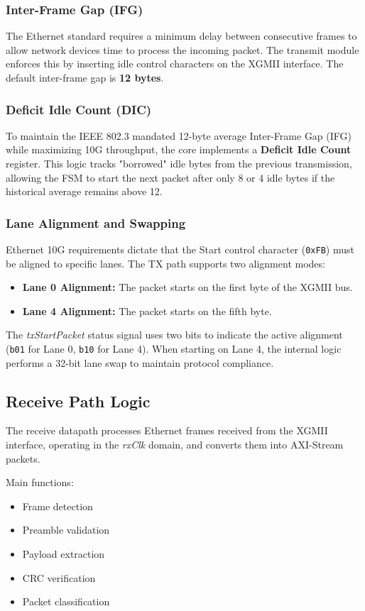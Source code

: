 \subsubsection{Inter-Frame Gap (IFG)}
The Ethernet standard requires a minimum delay between consecutive frames to allow network devices time to process the incoming packet. The transmit module enforces this by inserting idle control characters on the XGMII interface. The default inter-frame gap is \textbf{12 bytes}.

\subsubsection{Deficit Idle Count (DIC)}
To maintain the IEEE 802.3 mandated 12-byte average Inter-Frame Gap (IFG) while maximizing 10G throughput, the core implements a \textbf{Deficit Idle Count} register. This logic tracks "borrowed" idle bytes from the previous transmission, allowing the FSM to start the next packet after only 8 or 4 idle bytes if the historical average remains above 12.

\subsubsection{Lane Alignment and Swapping}
Ethernet 10G requirements dictate that the Start control character (\texttt{0xFB}) must be aligned to specific lanes. The TX path supports two alignment modes:
\begin{itemize}
    \item \textbf{Lane 0 Alignment:} The packet starts on the first byte of the XGMII bus.
    \item \textbf{Lane 4 Alignment:} The packet starts on the fifth byte. 
\end{itemize}
The \textit{txStartPacket} status signal uses two bits to indicate the active alignment (\texttt{b01} for Lane 0, \texttt{b10} for Lane 4). When starting on Lane 4, the internal logic performs a 32-bit lane swap to maintain protocol compliance.


\subsection{Receive Path Logic}
The receive datapath processes Ethernet frames received from the XGMII interface, operating in the \textit{rxClk} domain, and converts them into AXI-Stream packets.

Main functions:
\begin{itemize}
    \item Frame detection
    \item Preamble validation
    \item Payload extraction
    \item CRC verification
    \item Packet classification
\end{itemize}

